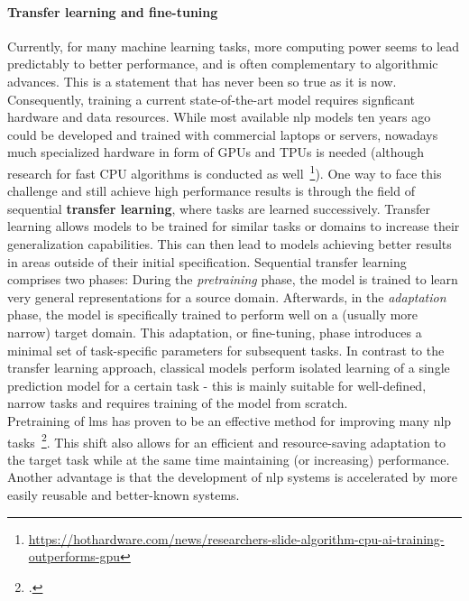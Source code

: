 \paragraph{Transfer learning and fine-tuning}
Currently, for many machine learning tasks, more computing power seems to lead predictably to better performance, and is often complementary to algorithmic advances. This is a statement that has never been so true as it is now. Consequently, training a current state-of-the-art model requires signficant hardware and data resources. While most available \gls{nlp} models ten years ago could be developed and trained with commercial laptops or servers, nowadays much specialized hardware in form of GPUs and TPUs is needed (although research for fast CPU algorithms is conducted as well~\footnote{\url{https://hothardware.com/news/researchers-slide-algorithm-cpu-ai-training-outperforms-gpu}}). One way to face this challenge and still achieve high performance results is through the field of sequential \textbf{transfer learning}, where tasks are learned successively. Transfer learning allows models to be trained for similar tasks or domains to increase their generalization capabilities. This can then lead to models achieving better results in areas outside of their initial specification. Sequential transfer learning comprises two phases: During the \textit{pretraining} phase, the model is trained to learn very general representations for a source domain. Afterwards, in the \textit{adaptation} phase, the model is specifically trained to perform well on a (usually more narrow) target domain. This adaptation, or fine-tuning, phase introduces a minimal set of task-specific parameters for subsequent tasks. In contrast to the transfer learning approach, classical models perform isolated learning of a single prediction model for a certain task - this is mainly suitable for well-defined, narrow tasks and requires training of the model from scratch. \\
Pretraining of \gls{lm}s has proven to be an effective method for improving many \gls{nlp} tasks~\footcite{DBLP:journals/corr/abs-1801-06146}. This shift also allows for an efficient and resource-saving adaptation to the target task while at the same time maintaining (or increasing) performance. Another advantage is that the development of \gls{nlp} systems is accelerated by more easily reusable and better-known systems.

